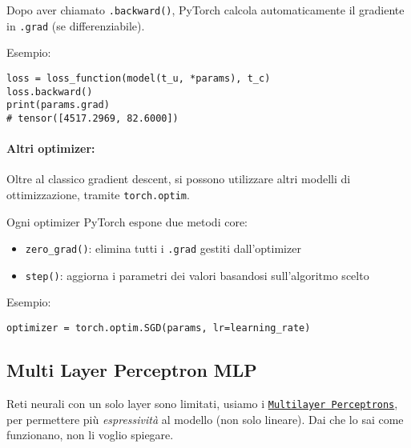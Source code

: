 Dopo aver chiamato \texttt{.backward()}, PyTorch calcola automaticamente il gradiente in \texttt{.grad} (se differenziabile). 

Esempio:
\begin{verbatim}
loss = loss_function(model(t_u, *params), t_c)
loss.backward()
print(params.grad)
# tensor([4517.2969, 82.6000])
\end{verbatim}

\paragraph{Altri optimizer:} Oltre al classico gradient descent, si possono utilizzare altri modelli di ottimizzazione, tramite \texttt{torch.optim}.

Ogni optimizer PyTorch espone due metodi core: 
\begin{itemize}
    \item \texttt{zero\_grad()}: elimina tutti i \texttt{.grad} gestiti dall'optimizer
    
    \item \texttt{step()}: aggiorna i parametri dei valori basandosi sull'algoritmo scelto
\end{itemize}

Esempio: 
\begin{verbatim}
optimizer = torch.optim.SGD(params, lr=learning_rate)
\end{verbatim}

\subsection{Multi Layer Perceptron MLP}

Reti neurali con un solo layer sono limitati, usiamo i \href{https://it.wikipedia.org/wiki/Percettrone_multistrato}{\texttt{Multilayer Perceptrons}}, per permettere più \textit{espressività} al modello (non solo lineare). Dai che lo sai come funzionano, non li voglio spiegare.

